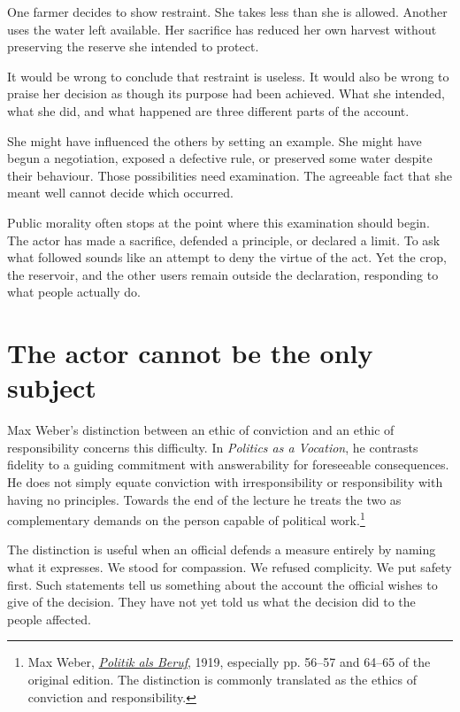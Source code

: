\documentclass[12pt,a4paper]{book}
\begin{document}
One farmer decides to show restraint. She takes less than she is allowed. Another uses the water left available. Her sacrifice has reduced her own harvest without preserving the reserve she intended to protect.

It would be wrong to conclude that restraint is useless. It would also be wrong to praise her decision as though its purpose had been achieved. What she intended, what she did, and what happened are three different parts of the account.

She might have influenced the others by setting an example. She might have begun a negotiation, exposed a defective rule, or preserved some water despite their behaviour. Those possibilities need examination. The agreeable fact that she meant well cannot decide which occurred.

Public morality often stops at the point where this examination should begin. The actor has made a sacrifice, defended a principle, or declared a limit. To ask what followed sounds like an attempt to deny the virtue of the act. Yet the crop, the reservoir, and the other users remain outside the declaration, responding to what people actually do.

\section*{The actor cannot be the only subject}

Max Weber's distinction between an ethic of conviction and an ethic of responsibility concerns this difficulty. In \emph{Politics as a Vocation}, he contrasts fidelity to a guiding commitment with answerability for foreseeable consequences. He does not simply equate conviction with irresponsibility or responsibility with having no principles. Towards the end of the lecture he treats the two as complementary demands on the person capable of political work.\footnote{Max Weber, \href{https://de.wikisource.org/wiki/Politik_als_Beruf}{\emph{Politik als Beruf}}, 1919, especially pp. 56--57 and 64--65 of the original edition. The distinction is commonly translated as the ethics of conviction and responsibility.}

The distinction is useful when an official defends a measure entirely by naming what it expresses. We stood for compassion. We refused complicity. We put safety first. Such statements tell us something about the account the official wishes to give of the decision. They have not yet told us what the decision did to the people affected.
\end{document}
